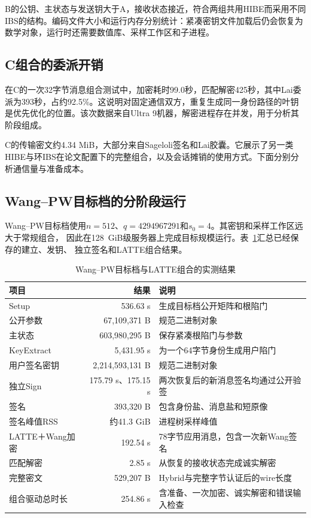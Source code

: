 B的公钥、主状态与发送钥大于A，接收状态接近，符合两组共用HIBE而采用不同IBS的结构。编码文件大小和运行内存分别统计：紧凑密钥文件加载后仍会恢复为数学对象，运行时还需要数值库、采样工作区和子进程。

\subsection{C组合的委派开销}
在C的一次32字节消息组合测试中，加密耗时99.0秒，匹配解密425秒，其中Lai委派为393秒，占约92.5\%。这说明对固定通信双方，重复生成同一身份路径的叶钥是优先优化的位置。该次数据来自Ultra 9机器，解密进程存在并发，用于分析其阶段组成。

C的传输密文约4.34 MiB，大部分来自Sageloli签名和Lai胶囊。它展示了另一类HIBE与环IBS在论文配置下的完整组合，以及会话摊销的使用方式。下面分别分析通信量与准备成本。

\subsection{Wang--PW目标档的分阶段运行}

Wang--PW目标档使用$n=512$、$q=4294967291$和$s_0=4$。其密钥和采样工作区远大于常规组合，
因此在128~GiB级服务器上完成目标规模运行。表~\ref{tab:wang-results}汇总已经保存的建立、发钥、
独立签名和LATTE组合结果。

\begin{table}[H]
\centering\small
\caption{Wang--PW目标档与LATTE组合的实测结果}
\label{tab:wang-results}
\begin{tabularx}{\textwidth}{@{}p{}rX@{}}
\toprule
\rowcolor{black!8} 项目 & 结果 & 说明 \\
\midrule
Setup & 536.63 s & 生成目标档公开矩阵和根陷门 \\
公开参数 & 67,109,371 B & 规范二进制对象 \\
主状态 & 603,980,295 B & 保存紧凑根陷门与参数 \\
KeyExtract & 5,431.95 s & 为一个64字节身份生成用户陷门 \\
用户签名密钥 & 2,214,593,131 B & 规范二进制对象 \\
独立Sign & 175.79 s、175.15 s & 两次恢复后的新消息签名均通过公开验签 \\
签名 & 393,320 B & 包含身份盐、消息盐和短原像 \\
签名峰值RSS & 约41.3 GiB & 进程树采样峰值 \\
LATTE＋Wang加密 & 192.54 s & 78字节应用消息，包含一次新Wang签名 \\
匹配解密 & 2.85 s & 从恢复的接收状态完成诚实解密 \\
完整密文 & 529,207 B & Hybrid与完整字节认证后的wire长度 \\
组合驱动总时长 & 254.86 s & 含准备、一次加密、诚实解密和错误输入检查 \\
\bottomrule
\end{tabularx}
\end{table}

